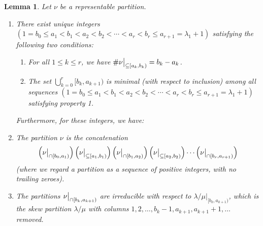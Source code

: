 \documentclass[12pt]{article}
\theoremstyle{plain}
\newtheorem{lemma}[theorem]{Lemma}
\theoremstyle{definition}
\def\seplistvar{{{\nu}}} %
\def\lm{{\lambda/\mu}}
\begin{document}
\begin{lemma}
\label{lemma:irreducible}
 Let $\seplistvar$ be a representable partition.

\begin{enumerate}

\item[\textbf{(a)}] There exist unique integers $(1=b_0\leq a_1<b_1<a_2<b_2<\cdots<a_r<b_r\leq a_{r+1}=\lambda_1+1)$ satisfying the following two conditions:
 \begin{enumerate}
  \item For all $1\leq k\leq r$, we have $\#\nuxy{a_k}{b_k} =b_k-a_k$.
  \item The set $\bigcup_{k=0}^{r}[b_k,a_{k+1})$ is minimal (with respect to inclusion) among all sequences $(1=b_0\leq a_1<b_1<a_2<b_2<\cdots<a_r<b_r\leq a_{r+1}=\lambda_1+1)$ satisfying property 1.
 \end{enumerate}

Furthermore, for these integers, we have:

\item[\textbf{(b)}] The partition $\nu$ is the concatenation
\[
\left(\nuxycap{b_0}{a_1}\right) \left(\nuxy{a_1}{b_1}\right) \left(\nuxycap{b_1}{a_2}\right) \left(\nuxy{a_2}{b_2}\right) \cdots \left(\nuxycap{b_r}{a_{r+1}}\right)
\]
(where we regard a partition as a sequence of positive integers, with no trailing zeroes).

\item[\textbf{(c)}] The partitions $\nuxycap{b_k}{a_{k+1}}$ are irreducible with respect to $\lm\big|_{[b_k,a_{k+1})}$,
 which is the skew partition $\lm$ with columns $1,2,\dots,b_k-1,a_{k+1},a_{k+1}+1,\dots$ removed.

\end{enumerate}
\end{lemma}
\end{document}
